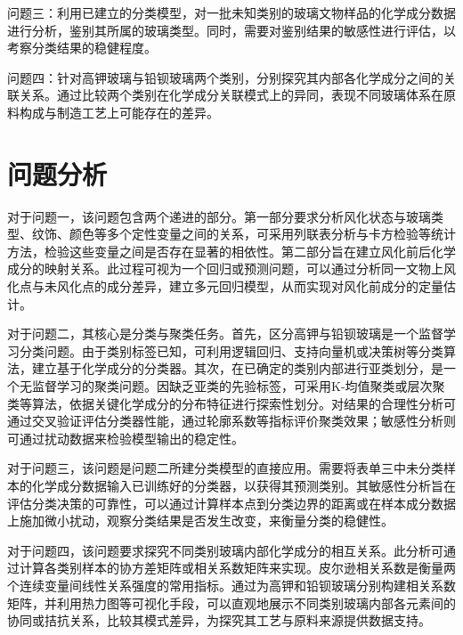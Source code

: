 问题三：利用已建立的分类模型，对一批未知类别的玻璃文物样品的化学成分数据进行分析，鉴别其所属的玻璃类型。同时，需要对鉴别结果的敏感性进行评估，以考察分类结果的稳健程度。

问题四：针对高钾玻璃与铅钡玻璃两个类别，分别探究其内部各化学成分之间的关联关系。通过比较两个类别在化学成分关联模式上的异同，表现不同玻璃体系在原料构成与制造工艺上可能存在的差异。

\section{问题分析}

对于问题一，该问题包含两个递进的部分。第一部分要求分析风化状态与玻璃类型、纹饰、颜色等多个定性变量之间的关系，可采用列联表分析与卡方检验等统计方法，检验这些变量之间是否存在显著的相依性。第二部分旨在建立风化前后化学成分的映射关系。此过程可视为一个回归或预测问题，可以通过分析同一文物上风化点与未风化点的成分差异，建立多元回归模型，从而实现对风化前成分的定量估计。

对于问题二，其核心是分类与聚类任务。首先，区分高钾与铅钡玻璃是一个监督学习分类问题。由于类别标签已知，可利用逻辑回归、支持向量机或决策树等分类算法，建立基于化学成分的分类器。其次，在已确定的类别内部进行亚类划分，是一个无监督学习的聚类问题。因缺乏亚类的先验标签，可采用K-均值聚类或层次聚类等算法，依据关键化学成分的分布特征进行探索性划分。对结果的合理性分析可通过交叉验证评估分类器性能，通过轮廓系数等指标评价聚类效果；敏感性分析则可通过扰动数据来检验模型输出的稳定性。

对于问题三，该问题是问题二所建分类模型的直接应用。需要将表单三中未分类样本的化学成分数据输入已训练好的分类器，以获得其预测类别。其敏感性分析旨在评估分类决策的可靠性，可以通过计算样本点到分类边界的距离或在样本成分数据上施加微小扰动，观察分类结果是否发生改变，来衡量分类的稳健性。

对于问题四，该问题要求探究不同类别玻璃内部化学成分的相互关系。此分析可通过计算各类别样本的协方差矩阵或相关系数矩阵来实现。皮尔逊相关系数是衡量两个连续变量间线性关系强度的常用指标。通过为高钾和铅钡玻璃分别构建相关系数矩阵，并利用热力图等可视化手段，可以直观地展示不同类别玻璃内部各元素间的协同或拮抗关系，比较其模式差异，为探究其工艺与原料来源提供数据支持。
